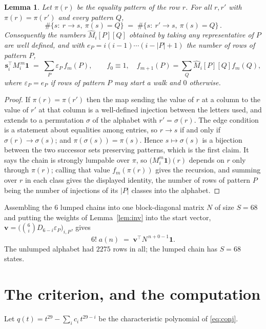 \documentclass[11pt,a4paper]{article}
\theoremstyle{plain}
\newtheorem{lemma}[theorem]{Lemma}
\theoremstyle{definition}
\begin{document}
\begin{lemma}\label{lem:lump}
Let $\pi(r)$ be the equality pattern of the row $r$. For all $r,r'$ with
$\pi(r)=\pi(r')$ and every pattern $Q$,
\[
\#\{s:\ r\to s,\ \pi(s)=Q\}\;=\;\#\{s:\ r'\to s,\ \pi(s)=Q\}\, .
\]
Consequently the numbers $\widehat M_i[P][Q]$ obtained by taking any representative of $P$
are well defined, and with $e_P=i(i-1)\cdots(i-|P|+1)$ the number of rows of pattern $P$,
\[
\mathbf{s}_i^{\!\top}M_i^{\,m}\mathbf{1}\;=\;\sum_P \varepsilon_P\,f_m(P),
\qquad f_0\equiv1,\quad f_{m+1}(P)=\sum_Q\widehat M_i[P][Q]f_m(Q),
\]
where $\varepsilon_P=e_P$ if rows of pattern $P$ may start a walk and $0$ otherwise.
\end{lemma}

\begin{proof}
If $\pi(r)=\pi(r')$ then the map sending the value of $r$ at a column to the value of $r'$
at that column is a well-defined injection between the letters used, and extends to a
permutation $\sigma$ of the alphabet with $r'=\sigma(r)$. The edge condition is a statement
about equalities among entries, so $r\to s$ if and only if $\sigma(r)\to\sigma(s)$; and
$\pi(\sigma(s))=\pi(s)$. Hence $s\mapsto\sigma(s)$ is a bijection between the two successor
sets preserving patterns, which is the first claim. It says the chain is strongly lumpable
over $\pi$, so $\bigl(M_i^{m}\mathbf{1}\bigr)(r)$ depends on $r$ only through $\pi(r)$;
calling that value $f_m(\pi(r))$ gives the recursion, and summing over $r$ in each class
gives the displayed identity, the number of rows of pattern $P$ being the number of
injections of its $|P|$ classes into the alphabet.
\end{proof}

Assembling the $6$ lumped chains into one block-diagonal matrix $N$ of size $S=68$ and
putting the weights of Lemma~\ref{lem:inv} into the start vector,
$\mathbf{v}=\bigl(\binom{6}{i}D_{6-i}\varepsilon_P\bigr)_{i,P}$, gives
\begin{equation}\label{eq:walk}
6!\;a(n)\;=\;\mathbf{v}^{\!\top}N^{\,n+0-1}\mathbf{1} .
\end{equation}
The unlumped alphabet had $2275$ rows in all; the lumped chain has $S=68$ states.

\section{The criterion, and the computation}

Let $q(t)=t^{29}-\sum_i c_i\,t^{29-i}$ be the characteristic polynomial of
\eqref{eq:conj}.
\end{document}
